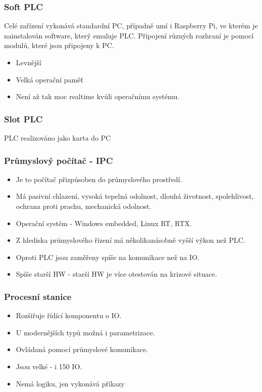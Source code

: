 \subsubsection*{Soft PLC}
Celé zařízení vykonává standardní PC, případně umí i Raspberry Pi, ve kterém je nainstalován software, který emuluje PLC. Připojení různých rozhraní je pomocí modulů, které jsou připojeny k PC. 
\begin{itemize}
  \item Levnější
  \item Velká operační paměť
  \item Není až tak moc realtime kvůli operačnímu systému.
\end{itemize}

\subsubsection*{Slot PLC}
PLC realizováno jako karta do PC

\subsubsection*{Průmyslový počítač - IPC}
\begin{itemize}
  \item Je to počítač přizpůsoben do průmyslového prostředí.
  \item Má pasivní chlazení, vysoká tepelná odolnost, dlouhá životnost, spolehlivost, ochrana proti prachu, mechanická odolnost.
  \item Operační systém - Windows embedded, Linux RT, RTX.
  \item Z hlediska průmyslového řízení má několikanásobně vyšší výkon než PLC.
  \item Oproti PLC jsou zaměřeny spíše na komunikace než na IO.
  \item Spíše starší HW - starší HW je více otestován na krizové situace.
\end{itemize}

\subsubsection*{Procesní stanice}
\begin{itemize}
  \item Rozšiřuje řídící komponentu o IO.
  \item U modernějších typů možná i parametrizace.
  \item Ovládaná pomocí průmyslové komunikace.
  \item Jsou velké - i 150 IO.
  \item Nemá logiku, jen vykonává příkazy
\end{itemize}

